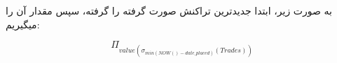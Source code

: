 به صورت زیر، ابتدا جدیدترین تراکنش صورت گرفته را گرفته، سپس مقدار آن را میگیریم:

\[\Pi_{{value}(\sigma_{min(NOW() - date\_placed)}(Trades))}\]